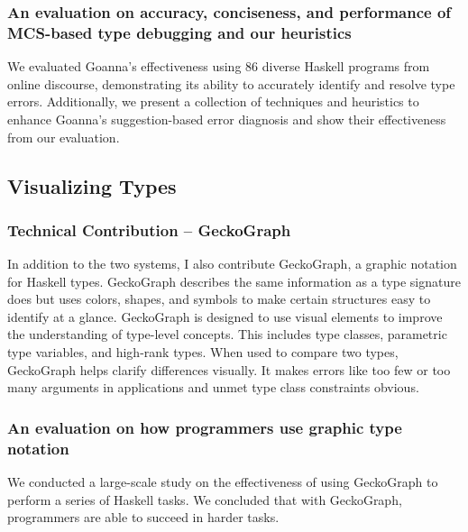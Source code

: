 \subsubsection{An evaluation on accuracy, conciseness, and performance of MCS-based type debugging and our heuristics}

We evaluated Goanna's effectiveness using 86 diverse Haskell programs from online discourse, demonstrating its ability to accurately identify and resolve type errors. Additionally, we present a collection of techniques and heuristics to enhance Goanna's suggestion-based error diagnosis and show their effectiveness from our evaluation.


\subsection{Visualizing Types}

\subsubsection{Technical Contribution -- GeckoGraph}

In addition to the two systems, I also contribute GeckoGraph, a graphic notation for Haskell types. GeckoGraph describes the same information as a type signature does but uses colors, shapes, and symbols to make certain structures easy to identify at a glance. GeckoGraph is designed to use visual elements to improve the understanding of type-level concepts. This includes type classes, parametric type variables, and high-rank types. When used to compare two types, GeckoGraph helps clarify differences visually. It makes errors like too few or too many arguments in applications and unmet type class constraints obvious.

\subsubsection{An evaluation on how programmers use graphic type notation}

We conducted a large-scale study on the effectiveness of using GeckoGraph to perform a series of Haskell tasks. We concluded that with GeckoGraph, programmers are able to succeed in harder tasks.



